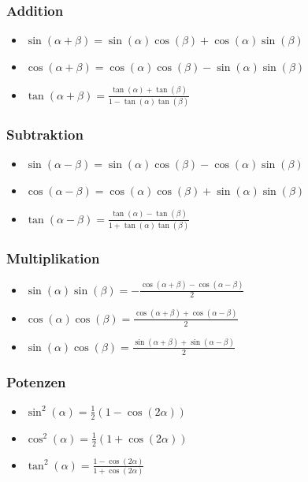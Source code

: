 \documentclass[a4paper,10pt]{article}
\begin{document}
\subsubsection{Addition}
\begin{itemize}
 \item $\sin(\alpha + \beta) = \sin(\alpha) \cos(\beta) + \cos(\alpha) \sin(\beta)$
 \item $\cos(\alpha + \beta) = \cos(\alpha) \cos(\beta) - \sin(\alpha) \sin(\beta)$
 \item $\tan(\alpha + \beta) = \frac{\tan(\alpha) + \tan(\beta)}{1 - \tan(\alpha) \tan(\beta)}$
\end{itemize}

\subsubsection{Subtraktion}
\begin{itemize}
 \item $\sin(\alpha - \beta) = \sin(\alpha) \cos(\beta) - \cos(\alpha)\sin(\beta)$
 \item $\cos(\alpha - \beta) = \cos(\alpha) \cos(\beta) + \sin(\alpha)\sin(\beta)$
 \item $\tan(\alpha - \beta) = \frac{\tan(\alpha) - \tan(\beta)}{1+\tan(\alpha) \tan(\beta)}$
\end{itemize}

\subsubsection{Multiplikation}
\begin{itemize}
 \item $\sin(\alpha) \sin(\beta) = -\frac{\cos(\alpha + \beta) - \cos(\alpha - \beta)}{2}$
 \item $\cos(\alpha) \cos(\beta) =  \frac{\cos(\alpha + \beta) + \cos(\alpha - \beta)}{2}$
 \item $\sin(\alpha) \cos(\beta) =  \frac{\sin(\alpha + \beta) + \sin(\alpha - \beta)}{2}$
\end{itemize}

\subsubsection{Potenzen}
\begin{itemize}
 \item $\sin^2(\alpha) = \frac{1}{2}(1-\cos(2\alpha))$
 \item $\cos^2(\alpha) = \frac{1}{2}(1+\cos(2\alpha))$
 \item $\tan^2(\alpha) = \frac{1-\cos(2\alpha)}{1+\cos(2\alpha)}$
\end{itemize}
\end{document}
